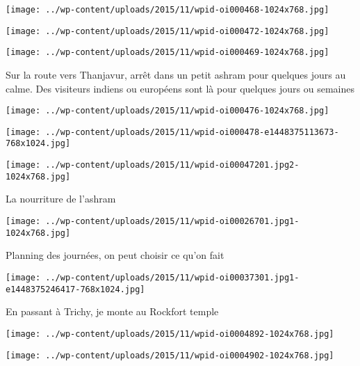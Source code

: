  \newline
\centerline{\texttt{[image: ../wp-content/uploads/2015/11/wpid-oi000468-1024x768.jpg]} } 
 \newline
 \newline
\centerline{\texttt{[image: ../wp-content/uploads/2015/11/wpid-oi000472-1024x768.jpg]} } 
 \newline
 \newline
\centerline{\texttt{[image: ../wp-content/uploads/2015/11/wpid-oi000469-1024x768.jpg]} } 
 \newline
 Sur la route vers Thanjavur, arrêt dans un petit ashram pour quelques jours au calme. Des visiteurs indiens ou européens sont là pour quelques jours ou semaines \newline
 \newline
\centerline{\texttt{[image: ../wp-content/uploads/2015/11/wpid-oi000476-1024x768.jpg]} } 
 \newline
 \newline
\centerline{\texttt{[image: ../wp-content/uploads/2015/11/wpid-oi000478-e1448375113673-768x1024.jpg]} } 
 \newline
 \newline
\centerline{\texttt{[image: ../wp-content/uploads/2015/11/wpid-oi00047201.jpg2-1024x768.jpg]} } 
 \newline
 La nourriture de l'ashram \newline
 \newline
\centerline{\texttt{[image: ../wp-content/uploads/2015/11/wpid-oi00026701.jpg1-1024x768.jpg]} } 
 \newline
 Planning des journées, on peut choisir ce qu'on fait \newline
 \newline
\centerline{\texttt{[image: ../wp-content/uploads/2015/11/wpid-oi00037301.jpg1-e1448375246417-768x1024.jpg]} } 
 \newline
 En passant à Trichy, je monte au Rockfort temple \newline
 \newline
\centerline{\texttt{[image: ../wp-content/uploads/2015/11/wpid-oi0004892-1024x768.jpg]} } 
 \newline
 \newline
\centerline{\texttt{[image: ../wp-content/uploads/2015/11/wpid-oi0004902-1024x768.jpg]} } 
 \newline
